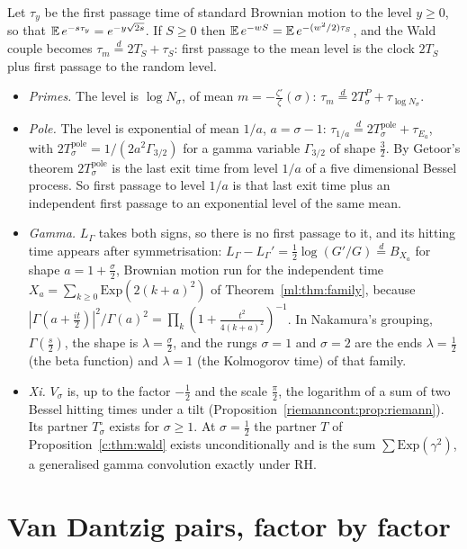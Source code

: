 Let $\tau_y$ be the first passage time of standard Brownian motion to the level $y\ge0$, so that $\mathbb{E}\,e^{-s\tau_y}=e^{-y\sqrt{2s}}$. If $S\ge0$ then $\mathbb{E}\,e^{-wS}=\mathbb{E}\,e^{-(w^2/2)\tau_S}$, and the Wald couple becomes $\tau_m\overset d=2T_S+\tau_S$: first passage to the mean level is the clock $2T_S$ plus first passage to the random level.
\begin{itemize}
\item \emph{Primes.} The level is $\log N_\sigma$, of mean $m=-\frac{\zeta'}\zeta(\sigma)$: $\tau_m\overset d=2T^P_\sigma+\tau_{\log N_\sigma}$.
\item \emph{Pole.} The level is exponential of mean $1/a$, $a=\sigma-1$: $\tau_{1/a}\overset d=2T^{\mathrm{pole}}_\sigma+\tau_{E_a}$, with $2T^{\mathrm{pole}}_\sigma=1/(2a^2\Gamma_{3/2})$ for a gamma variable $\Gamma_{3/2}$ of shape $\frac32$. By Getoor's theorem \cite{Getoor79} $2T^{\mathrm{pole}}_\sigma$ is the last exit time from level $1/a$ of a five dimensional Bessel process. So first passage to level $1/a$ is that last exit time plus an independent first passage to an exponential level of the same mean.
\item \emph{Gamma.} $L_\Gamma$ takes both signs, so there is no first passage to it, and its hitting time appears after symmetrisation: $L_\Gamma-L_\Gamma'=\frac12\log(G'/G)\overset d=B_{X_a}$ for shape $a=1+\frac\sigma2$, Brownian motion run for the independent time $X_a=\sum_{k\ge0}\mathrm{Exp}(2(k+a)^2)$ of Theorem~\ref{ml:thm:family}, because $|\Gamma(a+\frac{it}2)|^2/\Gamma(a)^2=\prod_k(1+\frac{t^2}{4(k+a)^2})^{-1}$. In Nakamura's grouping, $\Gamma(\frac s2)$, the shape is $\lambda=\frac\sigma2$, and the rungs $\sigma=1$ and $\sigma=2$ are the ends $\lambda=\frac12$ (the beta function) and $\lambda=1$ (the Kolmogorov time) of that family.
\item \emph{Xi.} $V_\sigma$ is, up to the factor $-\frac12$ and the scale $\frac\pi2$, the logarithm of a sum of two Bessel hitting times under a tilt (Proposition~\ref{riemanncont:prop:riemann}). Its partner $T^\circ_\sigma$ exists for $\sigma\ge1$. At $\sigma=\frac12$ the partner $T$ of Proposition~\ref{c:thm:wald} exists unconditionally and is the sum $\sum\mathrm{Exp}(\gamma^2)$, a generalised gamma convolution exactly under RH.
\end{itemize}

\section{Van Dantzig pairs, factor by factor}\label{nf:sec:vd}

